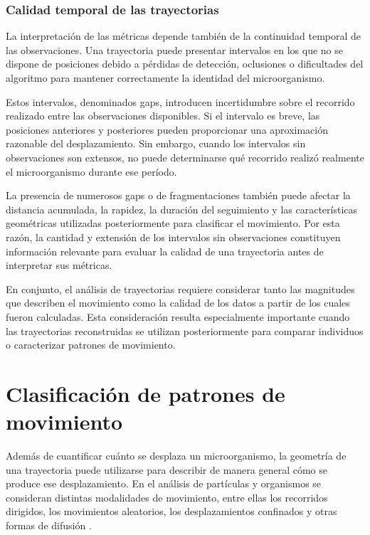 \subsubsection{Calidad temporal de las trayectorias}

La interpretación de las métricas depende también de la continuidad temporal de las observaciones. Una trayectoria puede presentar intervalos en los que no se dispone de posiciones debido a pérdidas de detección, oclusiones o dificultades del algoritmo para mantener correctamente la identidad del microorganismo.

Estos intervalos, denominados gaps, introducen incertidumbre sobre el recorrido realizado entre las observaciones disponibles. Si el intervalo es breve, las posiciones anteriores y posteriores pueden proporcionar una aproximación razonable del desplazamiento. Sin embargo, cuando los intervalos sin observaciones son extensos, no puede determinarse qué recorrido realizó realmente el microorganismo durante ese período.

La presencia de numerosos gaps o de fragmentaciones también puede afectar la distancia acumulada, la rapidez, la duración del seguimiento y las características geométricas utilizadas posteriormente para clasificar el movimiento. Por esta razón, la cantidad y extensión de los intervalos sin observaciones constituyen información relevante para evaluar la calidad de una trayectoria antes de interpretar sus métricas.

En conjunto, el análisis de trayectorias requiere considerar tanto las magnitudes que describen el movimiento como la calidad de los datos a partir de los cuales fueron calculadas. Esta consideración resulta especialmente importante cuando las trayectorias reconstruidas se utilizan posteriormente para comparar individuos o caracterizar patrones de movimiento.

\section{Clasificación de patrones de movimiento}

Además de cuantificar cuánto se desplaza un microorganismo, la geometría de una trayectoria puede utilizarse para describir de manera general cómo se produce ese desplazamiento. En el análisis de partículas y organismos se consideran distintas modalidades de movimiento, entre ellas los recorridos dirigidos, los movimientos aleatorios, los desplazamientos confinados y otras formas de difusión \cite{saxton1997,codling2008,monnier2012}.

